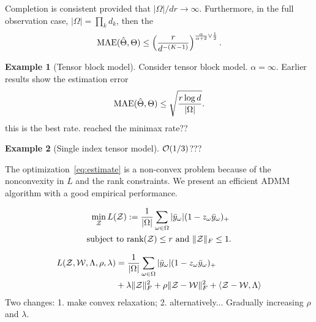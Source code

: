 \documentclass{article}
\theoremstyle{plain}
\newtheorem{thm}{Theorem}[section]
\theoremstyle{definition}
\newtheorem{example}{Example}
\def\rank{\textup{rank}}
\def\caliP{\mathscr{P}_{\textup{sgn}}}
\begin{document}
Completion is consistent provided that $|\Omega|/dr\to\infty$. Furthermore, in the full observation case, $|\Omega|=\prod_k d_k$, then the 
\[
\textup{MAE}(\hat \Theta, \Theta)\leq \left(r\over d^{-(K-1)}\right)^{{\alpha \over \alpha+2} \vee {1\over 2}}.
\]

\begin{example}[Tensor block model]
Consider tensor block model. $\alpha=\infty$. Earlier results show the estimation error
\[
\textup{MAE}(\hat \Theta, \Theta)\leq \sqrt{r\log d \over |\Omega|}.
\]
this is the best rate. reached the minimax rate??
\end{example}
\begin{example}[Single index tensor model]
$\mathcal{O}(1/3)$???
\end{example}

The optimization~\eqref{eq:estimate} is a non-convex problem because of the nonconvexity in $L$ and the rank constraints. We present an efficient ADMM algorithm with a good empirical performance. 

\begin{align}
\min_{\tZ}L(\tZ)&:={1\over |\Omega|}\sum_{\omega \in \Omega}|\bar y_\omega| (1-z_\omega\bar y_\omega)_{+}\\
\text{subject to }&\rank(\tZ)\leq r \ \text{and }\FnormSize{}{\tZ}\leq 1.
\end{align}

\begin{align}
L(\mathcal{Z},\mathcal{W},\Lambda,\rho,\lambda)&={1\over |\Omega|}\sum_{\omega \in \Omega}|\bar y_\omega| (1-z_\omega\bar y_\omega)_{+}\\
&+\lambda\lVert\mathcal{Z}\rVert_F^2+
\rho \lVert\mathcal{Z}-\mathcal{W}\rVert_F^2 + \langle \mathcal{Z}-\mathcal{W},\Lambda \rangle
\end{align}
Two changes: 1. make convex relaxation; 2. alternatively... Gradually increasing $\rho$ and $\lambda$.
\end{document}
